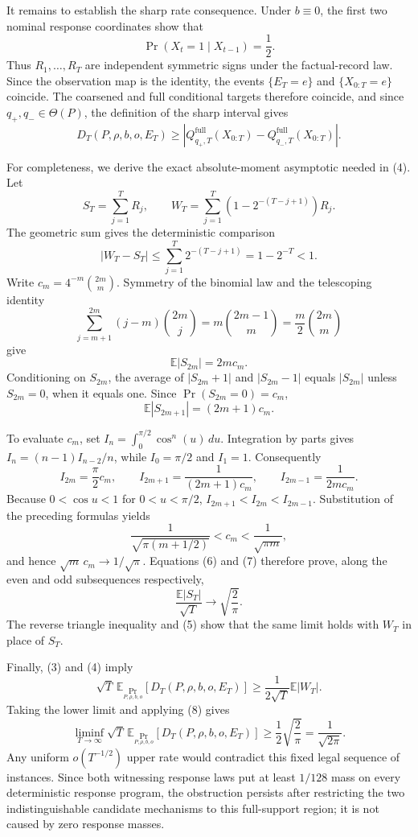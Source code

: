 It remains to establish the sharp rate consequence.  Under \(b\equiv0\), the first two nominal response coordinates show that
\[
 \Pr(X_t=1\mid X_{t-1})=\frac12.
\]
Thus \(R_1,\ldots,R_T\) are independent symmetric signs under the factual-record law.  Since the observation map is the identity, the events \(\{E_T=e\}\) and \(\{X_{0:T}=e\}\) coincide.  The coarsened and full conditional targets therefore coincide, and since \(q_+,q_-\in\Theta(P)\), the definition of the sharp interval gives
\[
 D_T(P,\rho,b,o,E_T)
 \ge
 \left|Q^{\mathrm{full}}_{q_+,T}(X_{0:T})
       -Q^{\mathrm{full}}_{q_-,T}(X_{0:T})\right|.
 \tag{4}
\]

For completeness, we derive the exact absolute-moment asymptotic needed in (4).  Let
\[
 S_T=\sum_{j=1}^TR_j,
 \qquad
 W_T=\sum_{j=1}^T\left(1-2^{-(T-j+1)}\right)R_j.
\]
The geometric sum gives the deterministic comparison
\[
 |W_T-S_T|
 \le\sum_{j=1}^T2^{-(T-j+1)}=1-2^{-T}<1.
 \tag{5}
\]
Write \(c_m=4^{-m}\binom{2m}{m}\).  Symmetry of the binomial law and the telescoping identity
\[
 \sum_{j=m+1}^{2m}(j-m)\binom{2m}{j}
 =m\binom{2m-1}{m}=\frac m2\binom{2m}{m}
\]
give
\[
 \mathbb E|S_{2m}|=2m c_m.
 \tag{6}
\]
Conditioning on \(S_{2m}\), the average of \(|S_{2m}+1|\) and \(|S_{2m}-1|\) equals \(|S_{2m}|\) unless \(S_{2m}=0\), when it equals one.  Since \(\Pr(S_{2m}=0)=c_m\),
\[
 \mathbb E|S_{2m+1}|=(2m+1)c_m.
 \tag{7}
\]

To evaluate \(c_m\), set \(I_n=\int_0^{\pi/2}\cos^n(u)\,du\).  Integration by parts gives \(I_n=(n-1)I_{n-2}/n\), while \(I_0=\pi/2\) and \(I_1=1\).  Consequently
\[
 I_{2m}=\frac\pi2c_m,
 \qquad
 I_{2m+1}=\frac1{(2m+1)c_m},
 \qquad
 I_{2m-1}=\frac1{2m c_m}.
\]
Because \(0<\cos u<1\) for \(0<u<\pi/2\),
\(I_{2m+1}<I_{2m}<I_{2m-1}\).  Substitution of the preceding formulas yields
\[
 \frac1{\sqrt{\pi(m+1/2)}}<c_m<\frac1{\sqrt{\pi m}},
\]
and hence \(\sqrt m\,c_m\to1/\sqrt\pi\).  Equations (6) and (7) therefore prove, along the even and odd subsequences respectively,
\[
 \frac{\mathbb E|S_T|}{\sqrt T}\longrightarrow\sqrt{\frac2\pi}.
 \tag{8}
\]
The reverse triangle inequality and (5) show that the same limit holds with \(W_T\) in place of \(S_T\).

Finally, (3) and (4) imply
\[
 \sqrt T\,\mathbb E_{\Pr_{P,\rho,b,o}}[D_T(P,\rho,b,o,E_T)]
 \ge \frac1{2\sqrt T}\mathbb E|W_T|.
\]
Taking the lower limit and applying (8) gives
\[
 \liminf_{T\to\infty}\sqrt T\,
 \mathbb E_{\Pr_{P,\rho,b,o}}[D_T(P,\rho,b,o,E_T)]
 \ge\frac12\sqrt{\frac2\pi}=\frac1{\sqrt{2\pi}}.
\]
Any uniform \(o(T^{-1/2})\) upper rate would contradict this fixed legal sequence of instances.  Since both witnessing response laws put at least \(1/128\) mass on every deterministic response program, the obstruction persists after restricting the two indistinguishable candidate mechanisms to this full-support region; it is not caused by zero response masses.
